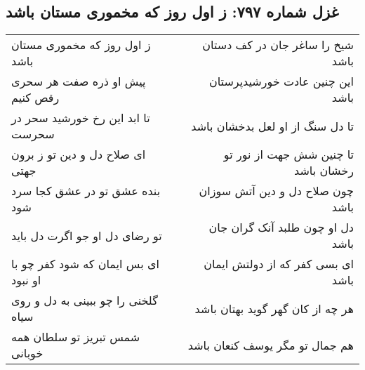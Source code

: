 \begin{center}
\section*{غزل شماره ۷۹۷: ز اول روز که مخموری مستان باشد}
\label{sec:0797}
\begin{longtable}{l p{0.5cm} r}
ز اول روز که مخموری مستان باشد
&&
شیخ را ساغر جان در کف دستان باشد
\\
پیش او ذره صفت هر سحری رقص کنیم
&&
این چنین عادت خورشیدپرستان باشد
\\
تا ابد این رخ خورشید سحر در سحرست
&&
تا دل سنگ از او لعل بدخشان باشد
\\
ای صلاح دل و دین تو ز برون جهتی
&&
تا چنین شش جهت از نور تو رخشان باشد
\\
بنده عشق تو در عشق کجا سرد شود
&&
چون صلاح دل و دین آتش سوزان باشد
\\
تو رضای دل او جو اگرت دل باید
&&
دل او چون طلبد آنک گران جان باشد
\\
ای بس ایمان که شود کفر چو با او نبود
&&
ای بسی کفر که از دولتش ایمان باشد
\\
گلخنی را چو ببینی به دل و روی سیاه
&&
هر چه از کان گهر گوید بهتان باشد
\\
شمس تبریز تو سلطان همه خوبانی
&&
هم جمال تو مگر یوسف کنعان باشد
\\
\end{longtable}
\end{center}
